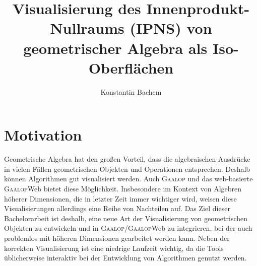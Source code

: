 \documentclass[
	ngerman,%
	accentcolor=9c,%
	ruledheaders=section,%
	class=report,%
	thesis={type=bachelor},%
	fontsize=11pt,%
	parskip=half-,%
	custommargins=true,%
	marginpar=false,%
]{tudapub}
\title{Visualisierung des Innenprodukt-Nullraums (IPNS) von geometrischer Algebra als Iso-Oberflächen}
\author{Konstantin Bachem}
\begin{document}
\maketitle


\tableofcontents





%

\chapter{Motivation}
Geometrische Algebra hat den großen Vorteil, dass die algebraischen Ausdrücke in vielen Fällen geometrischen Objekten und Operationen entsprechen. Deshalb können Algorithmen gut visualisiert werden. Auch \textsc{Gaalop} und das web-basierte \textsc{Gaalop}Web bietet diese Möglichkeit. Insbesondere im Kontext von Algebren höherer Dimensionen, die in letzter Zeit immer wichtiger wird, weisen diese Visualisierungen allerdings eine Reihe von Nachteilen auf.
Das Ziel dieser Bachelorarbeit ist deshalb, eine neue Art der Visualisierung von geometrischen Objekten zu entwickeln und in \textsc{Gaalop}/\textsc{Gaalop}Web zu integrieren, bei der auch problemlos mit höheren Dimensionen gearbeitet werden kann. Neben der korrekten Visualisierung ist eine niedrige Laufzeit wichtig, da die Tools üblicherweise interaktiv bei der Entwicklung von Algorithmen genutzt werden.

\end{document}
